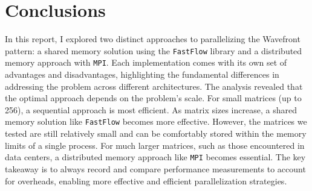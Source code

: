 \section*{Conclusions}
In this report, I explored two distinct approaches to parallelizing the Wavefront pattern: a shared memory solution using the \texttt{FastFlow} library and a distributed memory approach with \texttt{MPI}. Each implementation comes with its own set of advantages and disadvantages, highlighting the fundamental differences in addressing the problem across different architectures. The analysis revealed that the optimal approach depends on the problem's scale. For small matrices (up to 256), a sequential approach is most efficient. As matrix sizes increase, a shared memory solution like \texttt{FastFlow} becomes more effective. However, the matrices we tested are still relatively small and can be comfortably stored within the memory limits of a single process. For much larger matrices, such as those encountered in data centers, a distributed memory approach like \texttt{MPI} becomes essential. The key takeaway is to always record and compare performance measurements to account for overheads, enabling more effective and efficient parallelization strategies.